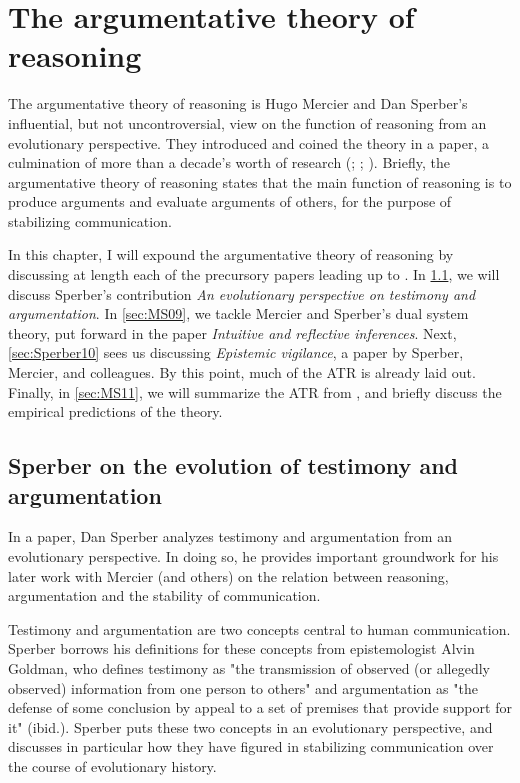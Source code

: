 \chapter{The argumentative theory of reasoning}
\label{ch:atr}

The argumentative theory of reasoning is Hugo Mercier and Dan Sperber's influential, but not uncontroversial, view on the function of reasoning from an evolutionary perspective. They introduced and coined the theory in a \citeyear{MS11} paper, a culmination of more than a decade's worth of research (\citealp{Sperber01}; \citealp{MS09}; \citealp{Sperber10}).
Briefly, the argumentative theory of reasoning states that the main function of reasoning is to produce arguments and evaluate arguments of others, for the purpose of stabilizing communication.

In this chapter, I will expound the argumentative theory of reasoning by discussing at length each of the precursory papers leading up to \citet{MS11}.
In \cref{sec:Sperber01}, we will discuss Sperber's \citeyear{Sperber01} contribution \emph{An evolutionary perspective on testimony and argumentation}. In \cref{sec:MS09}, we tackle Mercier and Sperber's dual system theory, put forward in the \citeyear{MS09} paper \emph{Intuitive and reflective inferences}.
Next, \cref{sec:Sperber10} sees us discussing \emph{Epistemic vigilance}, a \citeyear{Sperber10} paper by Sperber, Mercier, and colleagues.
By this point, much of the ATR is already laid out.
Finally, in \cref{sec:MS11}, we will summarize the ATR from \citet{MS11}, and briefly discuss the empirical predictions of the theory.

\section{Sperber on the evolution of testimony and argumentation}
\label{sec:Sperber01}

In a \citeyear{Sperber01} paper, Dan Sperber analyzes testimony and argumentation from an evolutionary perspective. In doing so, he provides important groundwork for his later work with Mercier (and others) on the relation between reasoning, argumentation and the stability of communication.

Testimony and argumentation are two concepts central to human communication. Sperber borrows his definitions for these concepts from epistemologist Alvin Goldman, who defines testimony as "the transmission of observed (or allegedly observed) information from one person to others" \citep[p.~401]{Sperber01} and argumentation as "the defense of some conclusion by appeal to a set of premises that provide support for it" (ibid.).
Sperber puts these two concepts in an evolutionary perspective, and discusses in particular how they have figured in stabilizing communication over the course of evolutionary history.

